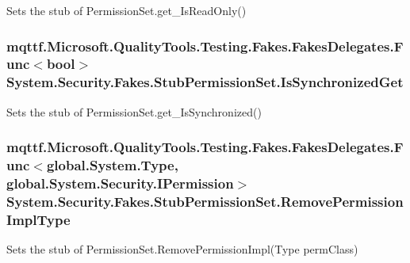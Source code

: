Sets the stub of Permission\-Set.\-get\-\_\-\-Is\-Read\-Only()

\hypertarget{class_system_1_1_security_1_1_fakes_1_1_stub_permission_set_aa0d3d217f0205d6e2733e7d9a21dd75d}{
\subsubsection[{Is\-Synchronized\-Get}]{\setlength{\rightskip}{0pt plus 5cm}mqttf.\-Microsoft.\-Quality\-Tools.\-Testing.\-Fakes.\-Fakes\-Delegates.\-Func$<$bool$>$ System.\-Security.\-Fakes.\-Stub\-Permission\-Set.\-Is\-Synchronized\-Get}}\label{class_system_1_1_security_1_1_fakes_1_1_stub_permission_set_aa0d3d217f0205d6e2733e7d9a21dd75d}


Sets the stub of Permission\-Set.\-get\-\_\-\-Is\-Synchronized()

\hypertarget{class_system_1_1_security_1_1_fakes_1_1_stub_permission_set_aace89d4cf1869c911520b4bd114370ec}{
\subsubsection[{Remove\-Permission\-Impl\-Type}]{\setlength{\rightskip}{0pt plus 5cm}mqttf.\-Microsoft.\-Quality\-Tools.\-Testing.\-Fakes.\-Fakes\-Delegates.\-Func$<$global.\-System.\-Type, global.\-System.\-Security.\-I\-Permission$>$ System.\-Security.\-Fakes.\-Stub\-Permission\-Set.\-Remove\-Permission\-Impl\-Type}}\label{class_system_1_1_security_1_1_fakes_1_1_stub_permission_set_aace89d4cf1869c911520b4bd114370ec}


Sets the stub of Permission\-Set.\-Remove\-Permission\-Impl(\-Type perm\-Class)

